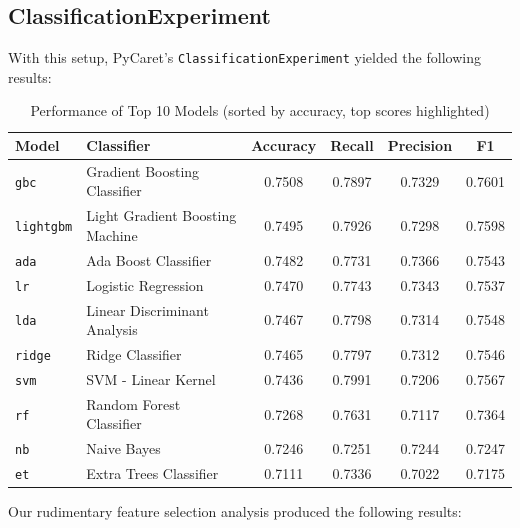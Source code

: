 \documentclass[a4paper,12pt]{article}
\begin{document}
\subsection{ClassificationExperiment}
With this setup, PyCaret's \texttt{ClassificationExperiment} yielded the following results:

\begin{table}[H]
    \centering
    \begin{tabular}{l l c c c c}
    \toprule
    \textbf{Model} & \textbf{Classifier} & \textbf{Accuracy} & \textbf{Recall} & \textbf{Precision} & \textbf{F1} \\
    \midrule
    \texttt{gbc} & Gradient Boosting Classifier & \cellcolor{yellow}0.7508 & 0.7897 & 0.7329 & \cellcolor{yellow}0.7601 \\
    \texttt{lightgbm} & Light Gradient Boosting Machine & 0.7495 & 0.7926 & 0.7298 & 0.7598 \\
    \texttt{ada} & Ada Boost Classifier & 0.7482 & 0.7731 & \cellcolor{yellow}0.7366 & 0.7543 \\
    \texttt{lr} & Logistic Regression & 0.7470 & 0.7743 & 0.7343 & 0.7537 \\
    \texttt{lda} & Linear Discriminant Analysis & 0.7467 & 0.7798 & 0.7314 & 0.7548 \\
    \texttt{ridge} & Ridge Classifier & 0.7465 & 0.7797 & 0.7312 & 0.7546 \\
    \texttt{svm} & SVM - Linear Kernel & 0.7436 & \cellcolor{yellow}0.7991 & 0.7206 & 0.7567 \\
    \texttt{rf} & Random Forest Classifier & 0.7268 & 0.7631 & 0.7117 & 0.7364 \\
    \texttt{nb} & Naive Bayes & 0.7246 & 0.7251 & 0.7244 & 0.7247 \\
    \texttt{et} & Extra Trees Classifier & 0.7111 & 0.7336 & 0.7022 & 0.7175 \\
    \bottomrule
    \end{tabular}
    \caption{Performance of Top 10 Models (sorted by accuracy, top scores highlighted)}
    \label{tab:model_performance}
    \end{table}
        
    

Our rudimentary feature selection analysis produced the following results:
\end{document}
